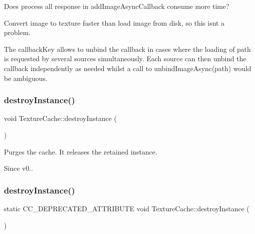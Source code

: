 Does process all response in add\+Image\+Async\+Callback consume more time?
\begin{DoxyItemize}
\item Convert image to texture faster than load image from disk, so this isn\textquotesingle{}t a problem.
\end{DoxyItemize}

The callback\+Key allows to unbind the callback in cases where the loading of path is requested by several sources simultaneously. Each source can then unbind the callback independently as needed whilst a call to unbind\+Image\+Async(path) would be ambiguous. \mbox{\label{classTextureCache_a39aaf943d5c4969590a5f0c2f2008d68}} 
\subsubsection{\texorpdfstring{destroy\+Instance()}{destroyInstance()}\hspace{0.1cm}{\footnotesize\ttfamily [1/2]}}
{\footnotesize\ttfamily void Texture\+Cache\+::destroy\+Instance (\begin{DoxyParamCaption}{ }\end{DoxyParamCaption})\hspace{0.3cm}{\ttfamily [static]}}

Purges the cache. It releases the retained instance. \begin{DoxySince}{Since}
v0.. 
\end{DoxySince}
\mbox{\label{classTextureCache_aecf51262381fa7b3e85066bb1b0a3b06}} 
\subsubsection{\texorpdfstring{destroy\+Instance()}{destroyInstance()}\hspace{0.1cm}{\footnotesize\ttfamily [2/2]}}
{\footnotesize\ttfamily static C\+C\+\_\+\+D\+E\+P\+R\+E\+C\+A\+T\+E\+D\+\_\+\+A\+T\+T\+R\+I\+B\+U\+TE void Texture\+Cache\+::destroy\+Instance (\begin{DoxyParamCaption}{ }\end{DoxyParamCaption})\hspace{0.3cm}{\ttfamily [static]}}

